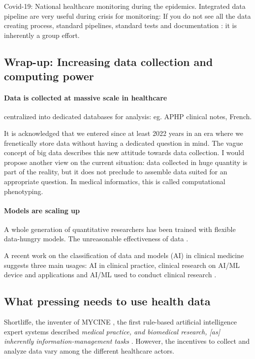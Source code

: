 \documentclass[french,12pt,twoside,a4paper]{book}
\begin{document}
Covid-19: National healthcare monitoring during the epidemics. Integrated data
pipeline are very useful during crisis for monitoring: If you do not see all the
data creating process, standard pipelines, standard tests and documentation : it
is inherently a group effort.

\subsection{Wrap-up: Increasing data collection and computing power}\label{subsec:intro:wrapup}

\paragraph{Data is collected at massive scale in healthcare} centralized
into dedicated databases for analysis: eg. APHP clinical notes, French.

It is acknowledged that we entered since at least 2022 years in an era where we
frenetically store data without having a dedicated question in mind. The vague
concept of big data describes this new attitude towards data collection. I would
propose another view on the current situation: data collected in huge quantity
is part of the reality, but it does not preclude to assemble data suited for an
appropriate question. In medical informatics, this is called computational
phenotyping.

\paragraph{Models are scaling up}
A whole generation of quantitative researchers has been trained with flexible
data-hungry models. The unreasonable effectiveness of data \citep{halevy2009unreasonable}.

A recent work on the classification of data and models (AI) in clinical medicine
suggests three main usages: AI in clinical practice, clinical research on AI/ML
device and applications and AI/ML used to conduct clinical research
\citep{haug2023artificial}.

\subsection{What pressing needs to use health data}

Shortliffe, the inventer of MYCINE \citep{shortliffe1974mycin}, the first
rule-based artificial intelligence expert systems described \textit{medical
  practice, and biomedical research, [as] inherently information-management tasks}
\citep{patel2009coming}. However, the incentives to collect and analyze data
vary among the different healthcare actors.
\end{document}
